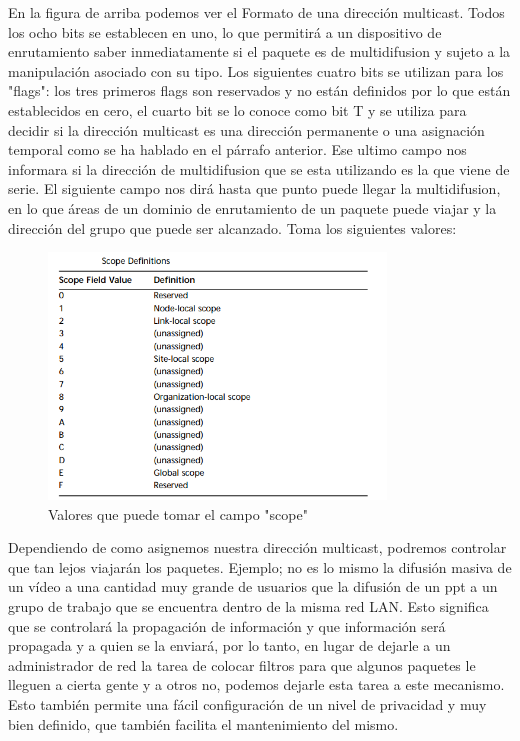 \documentclass[11pt,a4paper]{article}
\begin{document}
En la figura de arriba podemos ver el Formato de una dirección multicast. Todos los ocho bits se establecen en 
uno, lo que permitirá a un dispositivo de enrutamiento saber inmediatamente si el paquete es de multidifusion y 
sujeto a la manipulación asociado con su tipo. Los siguientes cuatro bits se utilizan para los "flags": los 
tres 
primeros flags son reservados y no están definidos por lo que están establecidos en cero, el cuarto bit se lo 
conoce como bit T y se utiliza para decidir si la dirección multicast es una dirección permanente o una 
asignación temporal como se ha hablado en el párrafo anterior. Ese ultimo campo nos informara si la dirección 
de multidifusion que se esta utilizando es la que viene de serie. El siguiente campo nos dirá hasta que punto 
puede llegar la multidifusion, en lo que áreas de un dominio de enrutamiento de un paquete puede viajar y la 
dirección del grupo que puede ser alcanzado. Toma los siguientes valores:\par
\begin{figure}[h!]
 \centering
 \includegraphics[width=0.8\textwidth]{valores.png}
 \caption[Valores del campo scope]{Valores que puede tomar el campo "scope"}
\end{figure} \par

Dependiendo de como asignemos nuestra dirección multicast, podremos controlar que tan lejos viajarán los 
paquetes. Ejemplo; no es lo mismo la difusión masiva de un vídeo a una cantidad muy grande de usuarios que la 
difusión de un ppt a un grupo de trabajo que se encuentra dentro de la misma red LAN. Esto significa que se 
controlará la propagación de información y que información será propagada y a quien se la enviará, por lo 
tanto, en lugar de dejarle a un administrador de red la tarea de colocar filtros para que algunos paquetes le 
lleguen a cierta gente y a otros no, podemos dejarle esta tarea a este mecanismo. Esto también permite una 
fácil configuración de un nivel de privacidad y muy bien definido, que también facilita el mantenimiento del 
mismo.
\end{document}

